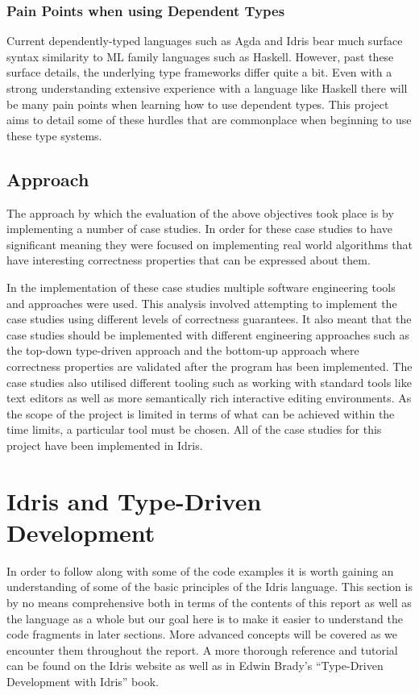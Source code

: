 \documentclass[a4paper, notitlepage]{report}
\begin{document}
\subsection{Pain Points when using Dependent Types}
\label{sec:org35f482d}
Current dependently-typed languages such as Agda and Idris bear much surface
syntax similarity to ML family languages such as Haskell. However, past these
surface details, the underlying type frameworks differ quite a bit. Even with a
strong understanding extensive experience with a language like Haskell there
will be many pain points when learning how to use dependent types. This project
aims to detail some of these hurdles that are commonplace when beginning to use
these type systems.

\section{Approach}
\label{sec:org3877f82}
The approach by which the evaluation of the above objectives took place is by
implementing a number of case studies. In order for these case studies to have
significant meaning they were focused on implementing real world algorithms that
have interesting correctness properties that can be expressed about them.

In the implementation of these case studies multiple software engineering tools
and approaches were used. This analysis involved attempting to implement the
case studies using different levels of correctness guarantees. It also meant
that the case studies should be implemented with different engineering
approaches such as the top-down type-driven approach and the bottom-up approach
where correctness properties are validated after the program has been
implemented. The case studies also utilised different tooling such as working
with standard tools like text editors as well as more semantically rich
interactive editing environments. As the scope of the project is limited in
terms of what can be achieved within the time limits, a particular tool must be
chosen. All of the case studies for this project have been implemented in Idris.
\chapter{Idris and Type-Driven Development}
\label{sec:org16201d2}
In order to follow along with some of the code examples it is worth gaining an
understanding of some of the basic principles of the Idris language. This
section is by no means comprehensive both in terms of the contents of this
report as well as the language as a whole but our goal here is to make it easier
to understand the code fragments in later sections. More advanced concepts will
be covered as we encounter them throughout the report. A more thorough reference
and tutorial can be found on the Idris website \cite{idris_tutorial_2017} as well
as in Edwin Brady's ``Type-Driven Development with Idris'' \cite{brady_book_2017}
book.
\end{document}
